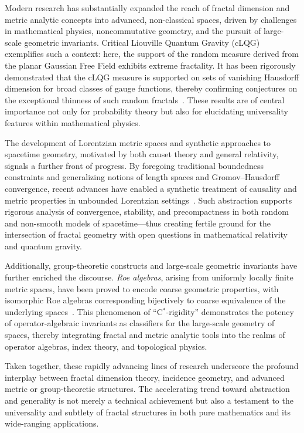 Modern research has substantially expanded the reach of fractal dimension and metric analytic concepts into advanced, non-classical spaces, driven by challenges in mathematical physics, noncommutative geometry, and the pursuit of large-scale geometric invariants. Critical Liouville Quantum Gravity (cLQG) exemplifies such a context: here, the support of the random measure derived from the planar Gaussian Free Field exhibits extreme fractality. It has been rigorously demonstrated that the cLQG measure is supported on sets of vanishing Hausdorff dimension for broad classes of gauge functions, thereby confirming conjectures on the exceptional thinness of such random fractals~\cite{ref81}. These results are of central importance not only for probability theory but also for elucidating universality features within mathematical physics.

The development of Lorentzian metric spaces and synthetic approaches to spacetime geometry, motivated by both causet theory and general relativity, signals a further front of progress. By foregoing traditional boundedness constraints and generalizing notions of length spaces and Gromov--Hausdorff convergence, recent advances have enabled a synthetic treatment of causality and metric properties in unbounded Lorentzian settings~\cite{ref51}. Such abstraction supports rigorous analysis of convergence, stability, and precompactness in both random and non-smooth models of spacetime---thus creating fertile ground for the intersection of fractal geometry with open questions in mathematical relativity and quantum gravity.

Additionally, group-theoretic constructs and large-scale geometric invariants have further enriched the discourse. \emph{Roe algebras}, arising from uniformly locally finite metric spaces, have been proved to encode coarse geometric properties, with isomorphic Roe algebras corresponding bijectively to coarse equivalence of the underlying spaces~\cite{ref52}. This phenomenon of ``C$^*$-rigidity'' demonstrates the potency of operator-algebraic invariants as classifiers for the large-scale geometry of spaces, thereby integrating fractal and metric analytic tools into the realms of operator algebras, index theory, and topological physics.

Taken together, these rapidly advancing lines of research underscore the profound interplay between fractal dimension theory, incidence geometry, and advanced metric or group-theoretic structures. The accelerating trend toward abstraction and generality is not merely a technical achievement but also a testament to the universality and subtlety of fractal structures in both pure mathematics and its wide-ranging applications.

